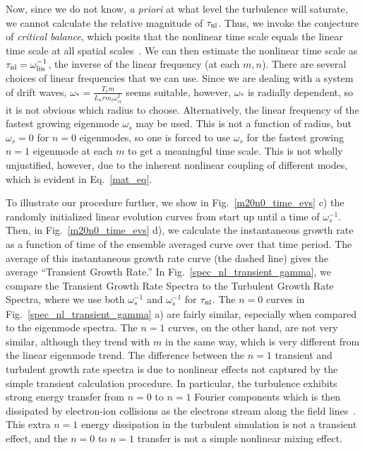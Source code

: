 \documentclass[showpacs,preprintnumbers,amsmath,amssymb,superscriptaddress,aip]{revtex4-1}
\begin{document}
Now, since we do not know, \emph{a priori} at what level the turbulence will saturate, we cannot calculate the relative magnitude of $\tau_{\rm{nl}}$.
Thus, we invoke the conjecture of \emph{critical balance}, which posits that the nonlinear time scale equals the linear time scale at all spatial scales~\cite{schekochihin2012}. 
We can then estimate the nonlinear time scale as $\tau_{\rm{nl}} = \omega_{\rm{lin}}^{-1}$, the inverse of the linear frequency (at each $m,n$).
There are several choices of linear frequencies that we can use. Since we are dealing with a system of drift waves, $\omega_* = \frac{T_e m}{L_n r m_i \omega_{ci}^2}$ seems suitable, however,
$\omega_*$ is radially dependent, so it is not obvious which radius to choose. Alternatively, the linear frequency of the fastest growing eigenmode $\omega_s$ may be used. This is not a function
of radius, but $\omega_s = 0$ for $n=0$ eigenmodes, so one is forced to use $\omega_s$ for the fastest growing $n=1$ eigenmode at each $m$ to get a meaningful time scale. This is not wholly
unjustified, however, due to the inherent nonlinear coupling of different modes, which is evident in Eq.~\ref{mat_eq}.

To illustrate our procedure further, we show in Fig.~\ref{m20n0_time_evs} c) the randomly initialized linear evolution curves from start up until a time of $\omega_s^{-1}$. 
Then, in Fig.~\ref{m20n0_time_evs} d), we calculate the instantaneous growth rate as a function of time of the ensemble averaged curve over that time period.
The average of this instantaneous growth rate curve (the dashed line) gives the average ``Transient Growth Rate.''
In Fig.~\ref{spec_nl_transient_gamma}, we compare the Transient Growth Rate Spectra to the Turbulent Growth Rate Spectra, where we use both $\omega_*^{-1}$ and $\omega_s^{-1}$ for $\tau_{\rm{nl}}$.
The $n=0$ curves in Fig.~\ref{spec_nl_transient_gamma} a) are fairly similar, especially when compared to the eigenmode spectra.
The $n=1$ curves, on the other hand, are not very similar, although they trend with $m$ in the same way, which is very different from the linear eigenmode trend.
The difference between the $n=1$ transient and turbulent growth rate spectra is due to nonlinear effects not captured by the simple transient calculation procedure. In particular, the turbulence
exhibits strong energy transfer from $n=0$ to $n=1$ Fourier components which is then dissipated by electron-ion collisions as the electrons stream along the field lines~\cite{friedman2012b}. 
This extra $n=1$ energy dissipation in the turbulent simulation is not a transient effect, and the $n=0$ to $n=1$ transfer is not a simple nonlinear mixing effect.
\end{document}

